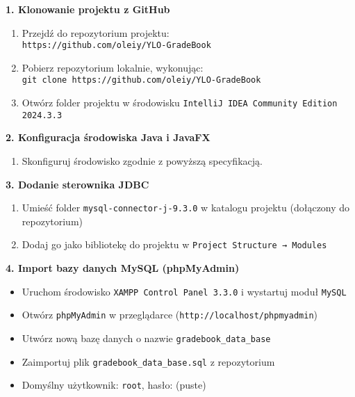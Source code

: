 \vspace{6pt}
\textbf{1. Klonowanie projektu z GitHub}

\begin{enumerate}
    \item Przejdź do repozytorium projektu: \\
    \texttt{https://github.com/oleiy/YLO-GradeBook}
    \item Pobierz repozytorium lokalnie, wykonując: \\
    \texttt{git clone https://github.com/oleiy/YLO-GradeBook}
    \item Otwórz folder projektu w środowisku \texttt{IntelliJ IDEA Community Edition 2024.3.3}
\end{enumerate}

\vspace{6pt}
\textbf{2. Konfiguracja środowiska Java i JavaFX}

\begin{enumerate}
    \item Skonfiguruj środowisko zgodnie z powyższą specyfikacją.
\end{enumerate}

\vspace{6pt}
\textbf{3. Dodanie sterownika JDBC}

\begin{enumerate}
    \item Umieść folder \texttt{mysql-connector-j-9.3.0} w katalogu projektu (dołączony do repozytorium)
    \item Dodaj go jako bibliotekę do projektu w \texttt{Project Structure → Modules}
\end{enumerate}

\vspace{6pt}
\textbf{4. Import bazy danych MySQL (phpMyAdmin)}

\begin{itemize}
    \item Uruchom środowisko \texttt{XAMPP Control Panel 3.3.0} i wystartuj moduł \texttt{MySQL}
    \item Otwórz \texttt{phpMyAdmin} w przeglądarce (\texttt{http://localhost/phpmyadmin})
    \item Utwórz nową bazę danych o nazwie \texttt{gradebook\_data\_base}
    \item Zaimportuj plik \texttt{gradebook\_data\_base.sql} z repozytorium
    \item Domyślny użytkownik: \texttt{root}, hasło: (puste)
\end{itemize}

